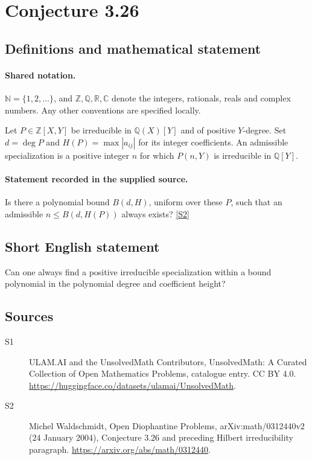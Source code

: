 \documentclass[11pt]{article}
\newcommand{\sref}[2]{\hyperlink{source:#1:#2}{[S#2]}}
\begin{document}
\section{Conjecture 3.26}\label{statement}

\subsection{Definitions and mathematical statement}

\paragraph{Shared notation.}$\mathbb N=\{1,2,\ldots\}$, and $\mathbb Z,\mathbb Q,\mathbb R,\mathbb C$ denote the integers, rationals, reals and complex numbers. Any other conventions are specified locally.


Let $P\in\mathbb Z[X,Y]$ be irreducible in $\mathbb Q(X)[Y]$ and of positive $Y$-degree. Set $d=\deg P$ and $H(P)=\max|a_{ij}|$ for its integer coefficients. An admissible specialization is a positive integer $n$ for which $P(n,Y)$ is irreducible in $\mathbb Q[Y]$.
\paragraph{Statement recorded in the supplied source.}
Is there a polynomial bound $B(d,H)$, uniform over these $P$, such that an admissible $n\le B(d,H(P))$ always exists? \sref{statement}{2}
\subsection{Short English statement}
Can one always find a positive irreducible specialization within a bound polynomial in the polynomial degree and coefficient height?
\subsection{Sources}
\begin{description}
\item[\hypertarget{source:statement:1}{S1}] ULAM.AI and the UnsolvedMath Contributors, UnsolvedMath: A Curated Collection of Open Mathematics Problems, catalogue entry. CC BY 4.0. \url{https://huggingface.co/datasets/ulamai/UnsolvedMath}.
\item[\hypertarget{source:statement:2}{S2}] Michel Waldschmidt, Open Diophantine Problems, arXiv:math/0312440v2 (24 January 2004), Conjecture 3.26 and preceding Hilbert irreducibility paragraph. \url{https://arxiv.org/abs/math/0312440}.
\end{description}
\label{end:statement}
\end{document}
